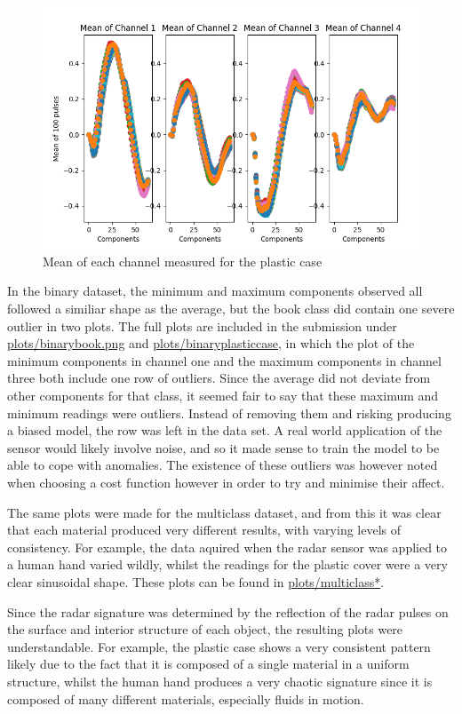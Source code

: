 \documentclass[12pt]{article}
\begin{document}
\begin{figure}[!ht]
	\centering
	\includegraphics[width=\linewidth]{images/plasticcase}
	\caption{Mean of each channel measured for the plastic case}
	\label{fig:plasticcase}
\end{figure}

In the binary dataset, the minimum and maximum components observed all followed a similiar shape as the average, but the book class did contain one severe outlier in two plots. The full plots are included in the submission under \url{plots/binarybook.png} and \url{plots/binaryplasticcase}, in which the plot of the minimum components in channel one and the maximum components in channel three both include one row of outliers. 
Since the average did not deviate from other components for that class, it seemed fair to say that these maximum and minimum readings were outliers. Instead of removing them and risking producing a biased model, the row was left in the data set. A real world application of the sensor would likely involve noise, and so it made sense to train the model to be able to cope with anomalies. The existence of these outliers was however noted when choosing a cost function however in order to try and minimise their affect.

The same plots were made for the multiclass dataset, and from this it was clear that each material produced very different results, with varying levels of consistency. For example, the data aquired when the radar sensor was applied to a human hand varied wildly, whilst the readings for the plastic cover were a very clear sinusoidal shape. These plots can be found in \url{plots/multiclass*}.

Since the radar signature was determined by the reflection of the radar pulses on the surface and interior structure of each object, the resulting plots were understandable. For example, the plastic case shows a very consistent pattern likely due to the fact that it is composed of a single material in a uniform structure, whilst the human hand produces a very chaotic signature since it is composed of many different materials, especially fluids in motion.
\end{document}
